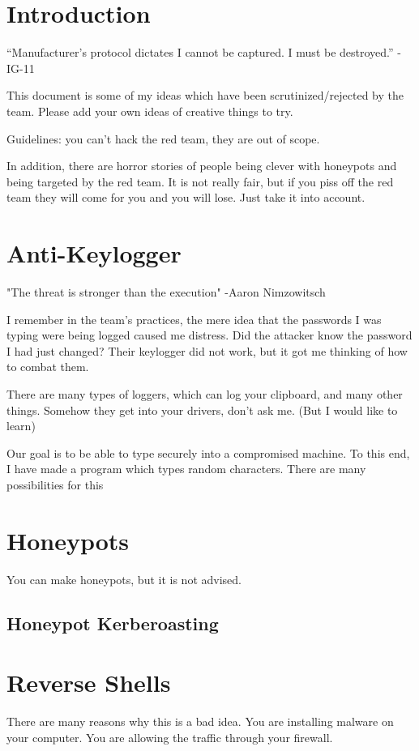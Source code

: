 \documentclass{article}
\begin{document}
\graphicspath{ {./Images/} }
\tableofcontents

\section{Introduction}
“Manufacturer's protocol dictates I cannot be captured. I must be destroyed.” - IG-11

This document is some of my ideas which have been scrutinized/rejected by the team. 
Please add your own ideas of creative things to try.

Guidelines: you can't hack the red team, they are out of scope.

In addition, there are horror stories of people being clever with honeypots and being targeted by the red team.
It is not really fair, but if you piss off the red team they will come for you and you will lose. Just take it into account.

\section{Anti-Keylogger}
"The threat is stronger than the execution"
-Aaron Nimzowitsch

I remember in the team's practices, the mere idea that the passwords I was typing were being logged caused me distress. 
Did the attacker know the password I had just changed? Their keylogger did not work, but it got me thinking of how to combat them.

There are many types of loggers, which can log your clipboard, and many other things. Somehow they get into your drivers, don't ask me. (But I would like to learn)

Our goal is to be able to type securely into a compromised machine. To this end, I have made a program which types random characters. There are many possibilities for this

\section{Honeypots}
You can make honeypots, but it is not advised.

\subsection{Honeypot Kerberoasting}

\section{Reverse Shells}
There are many reasons why this is a bad idea. You are installing malware on your computer. 
You are allowing the traffic through your firewall.
\end{document}
